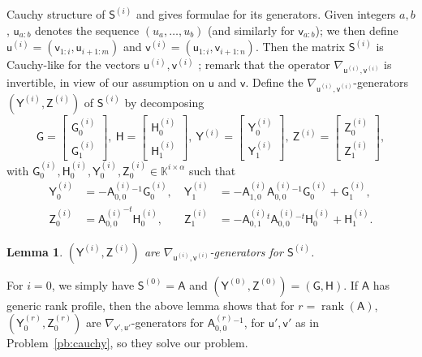 \documentclass{sig-alternate}
\newcommand{\vu}{\ensuremath{\mathsf{u}}}
\newcommand{\vv}{\ensuremath{\mathsf{v}}}
\newcommand{\mA}{\ensuremath{\mathsf{A}}}
\newcommand{\mG}{\ensuremath{\mathsf{G}}}
\newcommand{\mH}{\ensuremath{\mathsf{H}}}
\newcommand{\mS}{\ensuremath{\mathsf{S}}}
\newcommand{\mY}{\ensuremath{\mathsf{Y}}}
\newcommand{\mZ}{\ensuremath{\mathsf{Z}}}
\newcommand{\K}{\ensuremath{\mathbb{K}}}
\newcommand{\rank}{\ensuremath{\operatorname{rank}}}
\newtheorem{lemma}[definition]{Lemma}
\begin{document}
Cauchy structure of $\mS^{(i)}$ and gives formulae for its generators. Given
integers $a,b$, $\vu_{a:b}$ denotes the sequence $(u_a,\dots,u_b)$ (and
similarly for $\vv_{a:b}$); we then define $\vu^{(i)}=(\vv_{1:i},\vu_{i+1:m})$
and $\vv^{(i)}=(\vu_{1:i},\vv_{i+1:n})$. Then the matrix $\mS^{(i)}$ is
Cauchy-like for the vectors $\vu^{(i)}, \vv^{(i)}$ ; remark that the operator
$\nabla_{\vu^{(i)},\vv^{(i)}}$ is invertible, in view of our assumption on $\vu$
and $\vv$. Define the $\nabla_{\vu^{(i)},\vv^{(i)}}$-generators
$(\mY^{(i)}, \mZ^{(i)})$ of $\mS^{(i)}$ by decomposing
\[
 \mG=\begin{bmatrix} 
   \mG^{(i)}_0 \\ \mG^{(i)}_1
  \end{bmatrix},\ 
  \mH=\begin{bmatrix} 
        \mH^{(i)}_0 \\    \mH^{(i)}_1 
  \end{bmatrix},\ 
 \mY^{(i)}
 = \begin{bmatrix}
  \mY^{(i)}_0 \\    \mY^{(i)}_1 
     \end{bmatrix},\ 
\mZ^{(i)}
 = \begin{bmatrix}
  \mZ^{(i)}_0 \\    \mZ^{(i)}_1 
     \end{bmatrix},
\]
with $\mG^{(i)}_0, \mH^{(i)}_0, \mY^{(i)}_0, \mZ^{(i)}_0 \in \K^{i \times \alpha}$ such that
\begin{align}
\mY^{(i)}_0&= -{\mA^{(i)}_{0,0}}{}^{-1} \mG^{(i)}_0,\  
&\mY^{(i)}_1&=-\mA^{(i)}_{1,0}{\mA^{(i)}_{0,0}}{}^{-1}\mG^{(i)}_0 + \mG^{(i)}_1,\label{eq:defYi}\\
\mZ^{(i)}_0&= {\mA^{(i)}_{0,0}}^{-t} \mH^{(i)}_0,\  
&\mZ^{(i)}_1&=-{\mA^{(i)}_{0,1}}{}^t{\mA^{(i)}_{0,0}}{}^{-t}\mH^{(i)}_0 + \mH^{(i)}_1\label{eq:defZi}.
\end{align}

\begin{lemma}\label{lemma:cpj-cm}
 $(\mY^{(i)},\mZ^{(i)})$ are $\nabla_{\vu^{(i)},\vv^{(i)}}$-generators for $\mS^{(i)}$.
\end{lemma}

For $i=0$, we simply have $\mS^{(0)}=\mA$ and
$(\mY^{(0)},\mZ^{(0)})=(\mG,\mH)$.  If $\mA$ has generic rank profile,
then the above lemma shows that for $r=\rank(\mA)$,
$(\mY^{(r)}_0,\mZ^{(r)}_0)$ are $\nabla_{\vv',\vu'}$-generators for
${\mA^{(r)}_{0,0}}{}^{-1}$, for $\vu',\vv'$ as in
Problem~\ref{pb:cauchy}, so they solve our problem.
\end{document}
